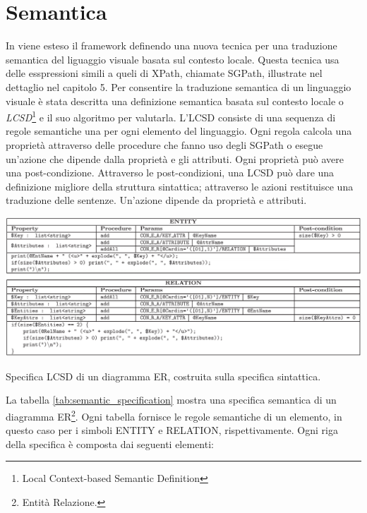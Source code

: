    \section{Semantica}
        \label{sec:semantica}
        In \cite{localcontext} viene esteso il framework definendo una nuova tecnica per una traduzione semantica del liguaggio visuale basata sul contesto locale. Questa tecnica usa delle esspressioni simili a queli di XPath, chiamate SGPath, illustrate nel dettaglio nel capitolo 5.
        \newline
        Per consentire la traduzione semantica di un linguaggio visuale è stata descritta una definizione semantica basata sul contesto locale o \textit{LCSD}\footnote{Local Context-based Semantic Definition} e il suo algoritmo per valutarla. L'LCSD consiste di una sequenza di regole semantiche una per ogni elemento del linguaggio. Ogni regola calcola una proprietà attraverso delle procedure che fanno uso degli SGPath o esegue un'azione che dipende dalla proprietà e gli attributi. Ogni proprietà può avere una post-condizione.
        \newline
        Attraverso le post-condizioni, una LCSD può dare una definizione migliore della struttura sintattica; attraverso le azioni restituisce una traduzione delle sentenze. Un'azione dipende da proprietà e attributi.
        \begin{table}[htbp]
            \centering
            \includegraphics[scale=0.37]{Figure/semantic_specification.PNG}
            \caption{Specifica LCSD di un diagramma ER, costruita sulla specifica sintattica.}
            \label{tab:semantic_specification}
        \end{table}
        \newline
        La tabella \ref{tab:semantic_specification} mostra una specifica semantica di un diagramma ER\footnote{Entità Relazione.}. Ogni tabella fornisce le regole semantiche di un elemento, in questo caso per i simboli ENTITY e RELATION, rispettivamente. Ogni riga della specifica è composta dai seguenti elementi:
